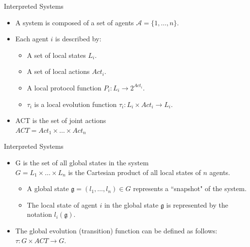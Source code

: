 \documentclass{beamer}
\begin{document}
    \begin{frame}{Interpreted Systems}
      \begin{itemize}
         \item A system is composed of a set of agents $ \mathcal{A}  =  \{  1, \dots, n  \} $.
         \item Each agent $i$ is described by:
                \begin{itemize}
                  \item A set of local states $L_i$.
                  \item A set of local actions $Act_i$.
                  \item A local protocol function $ P_i : L_i \rightarrow 2^{Act_i} $.
                  \item $ \tau_i $ is a local evolution function $ \tau_i : L_i \times Act_i \rightarrow L_i$.
                \end{itemize}
         \item ACT is the set of joint actions \\
          $ ACT = Act_1 \times \dots \times Act_n $
            \end{itemize}

    \end{frame}
\begin{frame}{Interpreted Systems}
    \begin{itemize}
    \item G is the set of all global states in the system \\
             $ G = L_1 \times \dots \times L_n$ is the Cartesian product of all local states of $n$ agents.
       \begin{itemize}
       \item A global state $ \mathfrak{g} = ( l_1, \dots,l_n) \in G$ represents a ``snapshot" of the system.
       \item The local state of agent $i$ in the global state $\mathfrak{g}$ is represented by the notation $ l_i(\mathfrak{g}) $.
       \end{itemize}
    \item The global evolution (transition) function can be defined as follows: $ \tau : G \times ACT \rightarrow G $.
    \end{itemize}
\end{frame}
\end{document}

